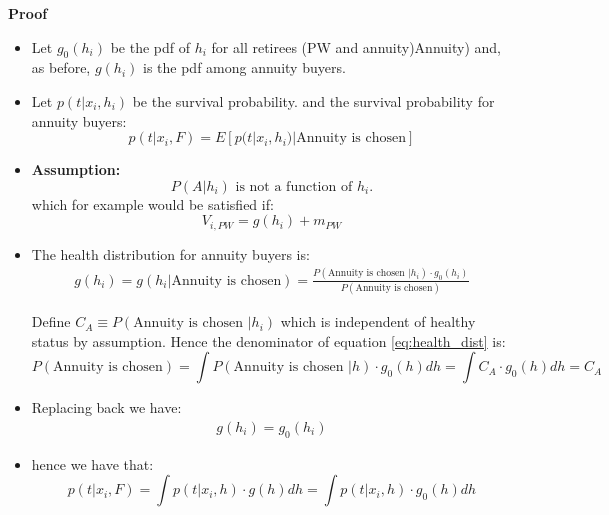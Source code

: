 \documentclass[12pt]{article}
\theoremstyle{plain}
\theoremstyle{plain}
\begin{document}
\textbf{Proof}

\begin{itemize}
    \item Let $g_0(h_i)$ be the pdf of  $h_i$ for all retirees (PW and annuity)Annuity) and, as before, $g(h_i)$ is the pdf among annuity buyers. 
    
    \item Let $p(t|x_i, h_i)$ be the survival probability. 
    and the survival probability for annuity buyers: 
    \[
    p(t|x_i, F) = E[p(t|x_i, h_i) | \text{Annuity is chosen}]
    \]
    \item \textbf{Assumption: }\[P(A|h_i) \text{ is not a function of } h_i.\]
    which for example would be satisfied if:  \[
    V_{i, PW} = g(h_i) + m_{PW}
    \]

    \item The health distribution for annuity buyers is: 
    \begin{align}\label{eq:health_dist}
        g(h_i) = g(h_i | \text{Annuity is chosen}) = \frac{P(\text{Annuity is chosen } | h_i) \cdot g_0(h_i)}{P(\text{Annuity is chosen})}    
    \end{align}
    
    Define  $C_A \equiv P(\text{Annuity is chosen } | h_i)$ which is independent of healthy status by assumption. Hence the denominator of equation \ref{eq:health_dist} is: 
     \[
    P(\text{Annuity is chosen}) = \int P(\text{Annuity is chosen } | h) \cdot g_0(h) dh = \int C_A \cdot g_0(h) dh = C_A
    \]
    \item Replacing back we have: 
        \begin{align} 
        g(h_i)= g_0(h_i)
    \end{align}

    \item hence we have that: 
    \[
    p(t|x_i, F) = \int p(t|x_i, h) \cdot g(h) dh = \int p(t|x_i, h) \cdot g_0(h) dh
    \]
\end{itemize}


 
  

 




 


  
\end{document}

